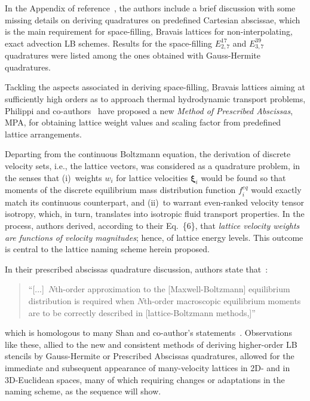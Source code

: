    In the Appendix of reference~\cite{2006-ShanX+ChenH-JFluidMech}, the authors include a brief discussion  with  some  missing
    details on deriving quadratures on predefined Cartesian abscissae, which is the main requirement for space-filling,  Bravais
    lattices for non-interpolating, exact advection LB schemes. Results for the space-filling $E_{2,7}^{17}$ and  $E_{3,7}^{39}$
    quadratures were listed among the ones obtained with Gauss-Hermite quadratures.


    Tackling the aspects associated in deriving space-filling, Bravais  lattices  aiming  at  sufficiently  high  orders  as  to
    approach thermal hydrodynamic  transport  problems,  Philippi  and  co-authors~\cite{2006-PhilippiPC+SurmasR-PhysRevE}  have
    proposed a new \emph{Method of Prescribed Abscissas\/}, MPA, for obtaining lattice weight values  and  scaling  factor  from
    predefined lattice arrangements.

    Departing from the continuous Boltzmann equation, the derivation of discrete velocity sets, i.e., the lattice  vectors,  was
    considered as a quadrature problem, in the senses that (i)~weights $w_i$ for lattice velocities $\pmb{\xi}_i$ would be found
    so that moments of the discrete equilibrium mass  distribution  function  $f^{eq}_i$  would  exactly  match  its  continuous
    counterpart, and (ii)~to warrant even-ranked velocity tensor isotropy, which,  in  turn,  translates  into  isotropic  fluid
    transport properties. In the process, authors derived, according to their Eq.~\{6\}, that \emph{lattice velocity weights are
    functions of velocity magnitudes}; hence, of lattice energy levels. This outcome is central to  the  lattice  naming  scheme
    herein proposed.

    In their prescribed abscissas quadrature discussion, authors state that~\cite[p.~6]{2006-PhilippiPC+SurmasR-PhysRevE}:
    \begin{quote}
        \swshape
        ``[...]~$N$th-order approximation to the [Maxwell-Boltzmann]  equilibrium  distribution  is  required  when  $N$th-order
        macroscopic equilibrium moments are to be correctly described in [lattice-Boltzmann methods,]''
    \end{quote}
    \noindent which is homologous to many Shan and co-author's statements~\cite{2006-ShanX+ChenH-JFluidMech}. Observations  like
    these, allied to the new and consistent methods  of  deriving  higher-order  LB  stencils  by  Gauss-Hermite  or  Prescribed
    Abscissas quadratures, allowed for the immediate  and  subsequent  appearance  of  many-velocity  lattices  in  2D-  and  in
    3D-Euclidean spaces, many of which requiring changes or adaptations in the naming scheme, as the sequence will show.

